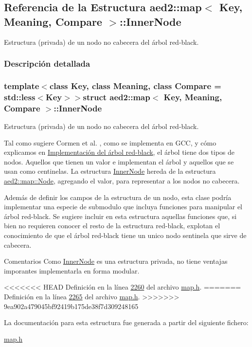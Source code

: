 \hypertarget{structaed2_1_1map_1_1InnerNode}{\subsection{\-Referencia de la \-Estructura aed2\-:\-:map$<$ \-Key, \-Meaning, \-Compare $>$\-:\-:\-Inner\-Node}
\label{structaed2_1_1map_1_1InnerNode}
}


\-Estructura (privada) de un nodo no cabecera del árbol red-\/black.  




\subsubsection{\-Descripción detallada}
\subsubsection*{template$<$class \-Key, class \-Meaning, class \-Compare = std\-::less$<$\-Key$>$$>$struct aed2\-::map$<$ Key, Meaning, Compare $>$\-::\-Inner\-Node}

\-Estructura (privada) de un nodo no cabecera del árbol red-\/black. 

\-Tal como sugiere \-Cormen et al. \cite{CormenLeisersonRivestStein2009}, como se implementa en \-G\-C\-C, y cómo explicamos en \hyperlink{Implementacion}{\-Implementación del árbol red-\/black}, el árbol tiene dos tipos de nodos. \-Aquellos que tienen un valor e implementan el árbol y aquellos que se usan como centinelas. \-La estructura \hyperlink{structaed2_1_1map_1_1InnerNode}{\-Inner\-Node} hereda de la estructura \hyperlink{structaed2_1_1map_1_1Node}{aed2\-::map\-::\-Node}, agregando el valor, para representar a los nodos no cabecera.

\-Además de definir los campos de la estructura de un nodo, esta clase podría implementar una especie de submodulo que incluya funciones para manipular el árbol red-\/black. \-Se sugiere incluir en esta estructura aquellas funciones que, si bien no requieren conocer el resto de la estructura red-\/black, explotan el conocimiento de que el árbol red-\/black tiene un unico nodo sentinela que sirve de cabecera.

\begin{DoxyRemark}{\-Comentarios}
\-Como \hyperlink{structaed2_1_1map_1_1InnerNode}{\-Inner\-Node} es una estructura privada, no tiene ventajas imporantes implementarla en forma modular. 
\end{DoxyRemark}


<<<<<<< HEAD
\-Definición en la línea \hyperlink{map_8h_source_l02260}{2260} del archivo \hyperlink{map_8h_source}{map.\-h}.
=======
Definición en la línea \hyperlink{map_8h_source_l02265}{2265} del archivo \hyperlink{map_8h_source}{map.\+h}.
>>>>>>> 9ea902a479045bf92419b175de38f7d309248165



\-La documentación para esta estructura fue generada a partir del siguiente fichero\-:\begin{DoxyCompactItemize}
\item 
\hyperlink{map_8h}{map.\-h}\end{DoxyCompactItemize}
